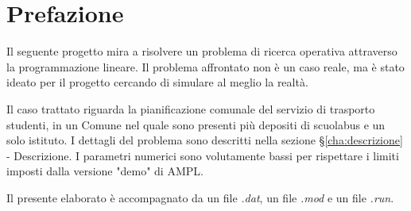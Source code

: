 
\chapter{Prefazione}

\ifpdf
    \graphicspath{{Chapter1/Figs/Raster/}{Chapter1/Figs/PDF/}{Chapter1/Figs/}}
\else
    \graphicspath{{Chapter1/Figs/Vector/}{Chapter1/Figs/}}
\fi


Il seguente progetto mira a risolvere un problema di ricerca operativa attraverso la programmazione lineare. Il problema affrontato non è un caso reale, ma è stato ideato per il progetto cercando di simulare al meglio la realtà.

Il caso trattato riguarda la pianificazione comunale del servizio di trasporto studenti, in un Comune nel quale sono presenti più depositi di scuolabus e un solo istituto. I dettagli del problema sono descritti nella sezione §\ref{cha:descrizione} - Descrizione. I parametri numerici sono volutamente bassi per rispettare i limiti imposti dalla versione "demo" di AMPL.

Il presente elaborato è accompagnato da un file \textit{.dat}, un file \textit{.mod} e un file \textit{.run}.